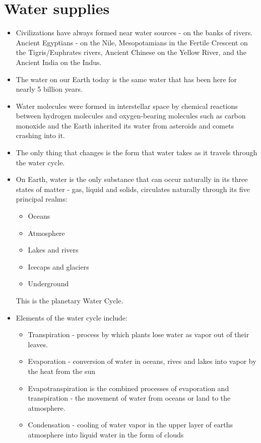 \section{Water supplies}
\begin{itemize}
\item Civilizations have always formed near water sources - on the banks of rivers. Ancient Egyptians - on the Nile, Mesopotamians in the Fertile Crescent on the Tigris/Euphrates rivers, Ancient Chinese on the Yellow River, and the Ancient India on the Indus.
\item The water on our Earth today is the same water that has been here for nearly 5 billion years.\\
\item Water molecules were formed in interstellar space by chemical reactions between hydrogen molecules and oxygen-bearing molecules such as carbon monoxide and the Earth inherited its water from asteroids and comets crashing into it.
\item The only thing that changes is the form that water takes as it travels through the water cycle.
\item On Earth, water is the only substance that can occur naturally in its three states of matter -  gas, liquid and solids, circulates naturally through its five principal realms:
\begin{itemize}
\item Oceans
\item Atmosphere
\item Lakes and rivers
\item Icecaps and glaciers
\item Underground
\end{itemize}
This is the planetary Water Cycle. 
\item Elements of the water cycle include:
\begin{itemize}
\item Transpiration - process by which plants lose water as vapor out of their leaves. 
\item Evaporation - conversion of water in oceans, rives and lakes into vapor by the heat from the sun
\item Evapotranspiration is the combined processes of evaporation and transpiration - the movement of water from oceans or land to the atmosphere.
\item Condensation - cooling of water vapor in the upper layer of earths atmosphere into liquid water in the form of clouds

\end{itemize}
\end{itemize}
